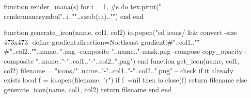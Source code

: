 \begin{luacode*}
    function render_mana(s)
        for i = 1, #s do
            tex.print("\\rendermanasymbol{"..i.."}{"..s:sub(i,i).."}")
        end
    end
\end{luacode*}
\newcommand{\rendermana}[1]{\directlua{render_mana(\luastring{#1})}}







\begin{luacode*}
    function generate_icon(name, col1, col2)
        io.popen("cd icons/ && convert -size 473x473 -define gradient:direction=Northeast gradient:\"#"..col1.."\"-\"#"..col2.."\" "..name..".png -composite "..name.."-mask.png -compose copy_opacity -composite "..name.."-"..col1.."-"..col2..".png")
    end
    function get_icon(name, col1, col2)
        filename = "icons/"..name.."-"..col1.."-"..col2..".png"
        -- check if it already exists
        local f = io.open(filename, "r")
        if f~=nil then 
            io.close(f) 
            return filename
        else 
            generate_icon(name, col1, col2)
            return filename  
        end
    end
\end{luacode*}
\newcommand{\geticon}[3]{\directlua{tex.print(get_icon(\luastring{#1}, \luastring{#2}, \luastring{#3}))}}
